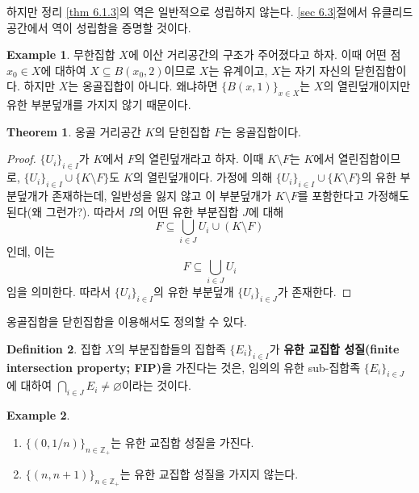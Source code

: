 \documentclass[11pt]{book}
\numberwithin{equation}{chapter}
\def\ZZ{\mathbb{Z}}
\theoremstyle{definition}
\newtheorem{thm}{Theorem}[section]
\newtheorem{defn}[thm]{Definition}
\newtheorem*{ex}{Example}
\newenvironment{enum}
	{\begin{enumerate}[label=(\alph*), leftmargin=2\parindent]}
	{\end{enumerate}}
\begin{document}
하지만 정리 \ref{thm 6.1.3}의 역은 일반적으로 성립하지 않는다. \ref{sec 6.3}절에서 유클리드공간에서 역이 성립함을 증명할 것이다.
\begin{ex}
    무한집합 \(X\)에 이산 거리공간의 구조가 주어졌다고 하자. 이때 어떤 점 \(x_0 \in X\)에 대하여 \(X \subseteq B(x_0, 2)\)이므로 \(X\)는 유계이고, \(X\)는 자기 자신의 닫힌집합이다. 하지만 \(X\)는 옹골집합이 아니다. 왜냐하면 \(\{B(x, 1)\}_{x \in X}\)는 \(X\)의 열린덮개이지만 유한 부분덮개를 가지지 않기 때문이다.
\end{ex}

\begin{thm}
    옹골 거리공간 \(K\)의 닫힌집합 \(F\)는 옹골집합이다.
\end{thm}
\begin{proof}
    \(\{U_i\}_{i \in I}\)가 \(K\)에서 \(F\)의 열린덮개라고 하자. 이때 \(K \setminus F\)는 \(K\)에서 열린집합이므로, \(\{U_i\}_{i \in I} \cup \{K \setminus F\}\)도 \(K\)의 열린덮개이다. 가정에 의해 \(\{U_i\}_{i \in I} \cup \{K \setminus F\}\)의 유한 부분덮개가 존재하는데, 일반성을 잃지 않고 이 부분덮개가 \(K \setminus F\)를 포함한다고 가정해도 된다(왜 그런가?). 따라서 \(I\)의 어떤 유한 부분집합 \(J\)에 대해
    \[
        F \subseteq \bigcup_{i \in J} U_i \cup (K \setminus F)
    \]
    인데, 이는
    \[
    F \subseteq   \bigcup_{i \in J} U_i  
    \]
    임을 의미한다. 따라서 \(\{U_i\}_{i \in I}\)의 유한 부분덮개 \(\{U_i\}_{i \in J}\)가 존재한다.
\end{proof}

옹골집합을 닫힌집합을 이용해서도 정의할 수 있다.

\begin{defn}
    집합 \(X\)의 부분집합들의 집합족 \(\{E_i\}_{i \in I}\)가 \textbf{유한 교집합 성질(finite intersection property; FIP)}을 가진다는 것은, 임의의 유한 sub-집합족 \(\{E_i\}_{i \in J}\)에 대하여 \(\bigcap_{i \in J} E_i \ne \varnothing\)이라는 것이다.
\end{defn}

\begin{ex}
    \quad

    \begin{enum}
        \item \(\{(0, 1/n)\}_{n \in \ZZ_+}\)는 유한 교집합 성질을 가진다.
        \item \(\{(n, n+1)\}_{n \in \ZZ_+}\)는 유한 교집합 성질을 가지지 않는다.
    \end{enum}
\end{ex}
\end{document}
